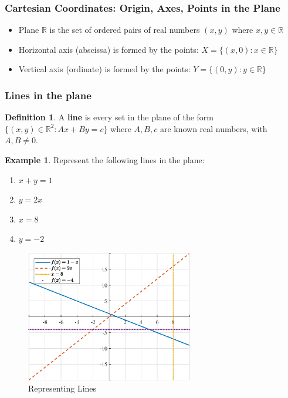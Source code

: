 \documentclass[a4paper,11pt]{article}
\theoremstyle{definition}
\newtheorem{definition}{Definition}
\newtheorem{example}{Example}
\theoremstyle{plain}
\begin{document}
\subsubsection{Cartesian Coordinates: Origin, Axes, Points in the
Plane}\label{cartesian-coordinates-origin-axes-points-in-the-plane}

\begin{itemize}
	\item
  Plane \(\mathbb{R}\) is the set of ordered pairs of real numbers
  \((x,y)\) where \(x,y\in\mathbb{R}\)
\item
  Horizontal axis (abscissa) is formed by the points:
  \(X = \{(x,0) : x\in\mathbb{R}\}\)
\item
  Vertical axis (ordinate) is formed by the points:
  \(Y = \{(0,y) : y\in\mathbb{R}\}\)
\end{itemize}

\subsubsection{Lines in the plane}\label{lines-in-the-plane}

\begin{definition}
A \textbf{line} is every set in the plane of the
form \(\{(x,y)\in\mathbb{R}^2 : Ax + By = c\}\) where \(A,B,c\) are
known real numbers, with \(A,B \neq 0\).
\end{definition}

\begin{example}
Represent the following lines in the plane:

\begin{enumerate}
\def\labelenumi{\arabic{enumi}.}
\item
  \(x+y=1\)
\item
  \(y=2x\)
\item
  \(x=8\)
\item
  \(y=-2\)
\end{enumerate}
\end{example}

\begin{figure}[htbp]
	\centering 
		\includegraphics[width = 0.65\textwidth]{Ch1_files/Ch1_2_0.eps} 
		\caption{Representing Lines}
		\label{fig:representing_lines}
\end{figure}    
\end{document}
